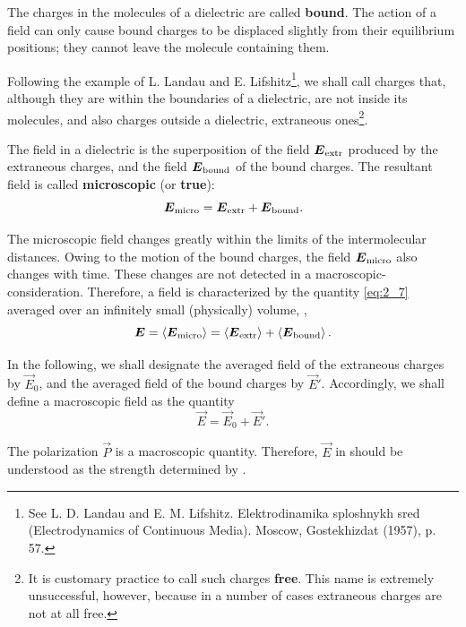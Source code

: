 The charges in the molecules of a dielectric are called \textbf{bound}. The action of a field can only cause bound charges to be displaced slightly from their equilibrium positions; they cannot leave the molecule containing them.

Following the example of L. Landau and E. Lifshitz\footnote{See L. D. Landau and E. M. Lifshitz. Elektrodinamika sploshnykh sred (Electrodynamics of Continuous Media). Moscow, Gostekhizdat (1957), p. 57.}, we shall call charges that, although they are within the boundaries of a dielectric, are not inside its molecules, and also charges outside a dielectric, extraneous ones\footnote{It is customary practice to call such charges \textbf{free}. This name is extremely unsuccessful, however, because in a number of cases extraneous charges are not at all free.}.

The field in a dielectric is the superposition of the field $\boldsymbol{E}_{\text{extr}}$ produced by the extraneous charges, and the field $\boldsymbol{E}_{\text{bound}}$ of the bound charges. The resultant field is called \textbf{microscopic} (or \textbf{true}):
\begin{equation}\label{eq:2_7}
    \boldsymbol{E}_{\text{micro}} = \boldsymbol{E}_{\text{extr}} + \boldsymbol{E}_{\text{bound}}.
\end{equation}

The microscopic field changes greatly within the limits of the intermolecular distances. Owing to the motion of the bound charges, the field $\boldsymbol{E}_{\text{micro}}$ also changes with time. These changes are not detected in a macroscopic-consideration. Therefore, a field is characterized by the quantity \eqref{eq:2_7} averaged over an infinitely small (physically) volume, \ie,
\begin{equation*}
    \boldsymbol{E} = \left\langle \boldsymbol{E}_{\text{micro}} \right\rangle = \left\langle \boldsymbol{E}_{\text{extr}} \right\rangle + \left\langle \boldsymbol{E}_{\text{bound}} \right\rangle.
\end{equation*}

In the following, we shall designate the averaged field of the extraneous charges by $\vec{E}_0$, and the averaged field of the bound charges by $\vec{E}'$. Accordingly, we shall define a macroscopic field as the quantity
\begin{equation}\label{eq:2_8}
    \vec{E} = \vec{E}_0 + \vec{E}'.
\end{equation}

The polarization $\vec{P}$ is a macroscopic quantity. Therefore, $\vec{E}$ in  should be understood as the strength determined by .

